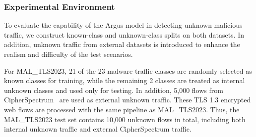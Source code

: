 \documentclass{SCIS2026}
\begin{document}
%
%


\subsubsection{Experimental Environment}

To evaluate the capability of the Argus model in detecting unknown malicious traffic, we construct known-class and unknown-class splits on both datasets. In addition, unknown traffic from external datasets is introduced to enhance the realism and difficulty of the test scenarios.

For MAL\_TLS2023, 21 of the 23 malware traffic classes are randomly selected as known classes for training, while the remaining 2 classes are treated as internal unknown classes and used only for testing. In addition, 5,000 flows from CipherSpectrum~\cite{CipherSpectrum} are used as external unknown traffic. These TLS 1.3 encrypted web flows are processed with the same pipeline as MAL\_TLS2023. Thus, the MAL\_TLS2023 test set contains 10,000 unknown flows in total, including both internal unknown traffic and external CipherSpectrum traffic.
\end{document}
